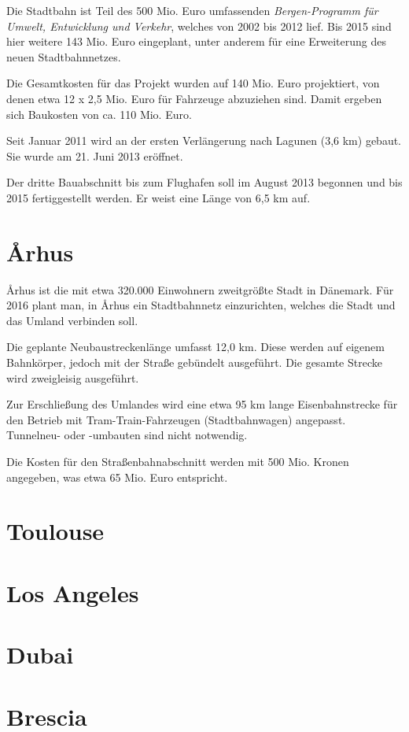 Die Stadtbahn ist Teil des 500 Mio. Euro umfassenden \emph{Bergen-Programm für
Umwelt, Entwicklung und Verkehr}, welches von 2002 bis 2012 lief. Bis 2015 sind
hier weitere 143 Mio. Euro eingeplant, unter anderem für eine Erweiterung des
neuen Stadtbahnnetzes.

Die Gesamtkosten für das Projekt wurden auf 140 Mio. Euro projektiert, von denen
etwa 12 x 2,5 Mio. Euro für Fahrzeuge abzuziehen sind. Damit ergeben sich
Baukosten von ca. 110 Mio. Euro.

Seit Januar 2011 wird an der ersten Verlängerung nach Lagunen (3,6 km)
gebaut. Sie wurde am 21. Juni 2013 eröffnet.

Der dritte Bauabschnitt bis zum Flughafen soll im August 2013 begonnen und bis
2015 fertiggestellt werden. Er weist eine Länge von 6,5 km auf.

\section{Århus}

Århus ist die mit etwa 320.000 Einwohnern zweitgrößte Stadt in Dänemark. Für 2016
plant man, in Århus ein Stadtbahnnetz einzurichten, welches die Stadt und das
Umland verbinden soll.

Die geplante Neubaustreckenlänge umfasst 12,0 km. Diese werden auf eigenem
Bahnkörper, jedoch mit der Straße gebündelt ausgeführt. Die gesamte Strecke wird
zweigleisig ausgeführt.

Zur Erschließung des Umlandes wird eine etwa 95 km lange Eisenbahnstrecke für
den Betrieb mit Tram-Train-Fahrzeugen (Stadtbahnwagen) angepasst. Tunnelneu-
oder -umbauten sind nicht notwendig.

Die Kosten für den Straßenbahnabschnitt werden mit 500 Mio. Kronen angegeben,
was etwa 65 Mio.  Euro entspricht.

\section{Toulouse}


\section{Los Angeles}


\section{Dubai}


\section{Brescia} 

